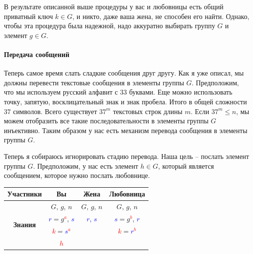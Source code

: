 В результате описанной выше процедуры у вас и любовницы есть общий приватный ключ $k\in G$, и никто, даже ваша жена, не способен его найти. Однако, чтобы эта процедура была надежной, надо аккуратно выбирать  группу $G$ и элемент $g\in G$.

\paragraph{Передача сообщений}

Теперь самое время слать сладкие сообщения друг другу.
Как я уже описал, мы должны перевести текстовые сообщения в элементы группы $G$.
Предположим, что мы используем русский алфавит с $33$ буквами. Еще можно использовать точку, запятую, восклицательный знак и знак пробела. Итого в общей сложности $37$ символов.
Всего существует $37^m$ текстовых строк длины $m$.
Если $37^m \leqslant n$, мы можем отобразить все такие последовательности в элементы группы $G$ инъективно. 
Таким образом у нас есть механизм перевода сообщения в элементы группы $G$.

Теперь я собираюсь игнорировать стадию перевода.
Наша цель -- послать элемент группы $G$. Предположим, у нас есть элемент $h\in G$, который является сообщением, которое нужно послать любовнице.
\begin{center}
\begin{tabular}{|c|c|c|c|}
\hline
{\bf Участники}&{Вы}&{Жена}&{Любовница}\\
\hline
\multirow{4}{*}{\bf Знания}&{\textcolor{OliveGreen}{$G$}, \textcolor{OliveGreen}{$g$}, \textcolor{OliveGreen}{$n$}}&{\textcolor{OliveGreen}{$G$}, \textcolor{OliveGreen}{$g$}, \textcolor{OliveGreen}{$n$}}&{\textcolor{OliveGreen}{$G$}, \textcolor{OliveGreen}{$g$}, \textcolor{OliveGreen}{$n$}}\\
{}&{ \textcolor{blue}{$r$}$=$\textcolor{OliveGreen}{$ g$}\textcolor{red}{${}^a$}, \textcolor{blue}{$s$}}&{\textcolor{blue}{$r$, $s$}}&{ \textcolor{blue}{$s$}$=$\textcolor{OliveGreen}{$g$}\textcolor{red}{${}^b$}, \textcolor{blue}{$r$}}\\
{}&{ \textcolor{red}{$k$}$=$\textcolor{blue}{$s$}\textcolor{red}{${}^a$}}&{}&{ \textcolor{red}{$k$}$=$\textcolor{blue}{$r$}\textcolor{red}{${}^b$}}\\
{}&{\textcolor{red}{$h$}}&{}&{}\\
\hline
\end{tabular}
\end{center}

